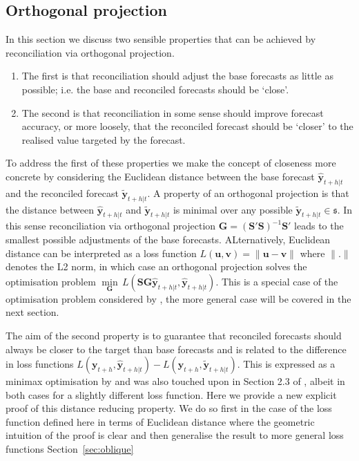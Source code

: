 \documentclass[12pt]{article}
\theoremstyle{definition}
\begin{document}
\subsection{Orthogonal projection}\label{sec:orthogonal}

In this section we discuss two sensible properties that can be achieved by reconciliation via orthogonal projection.
\begin{enumerate}
\item The first is that reconciliation should adjust the base forecasts as little as possible; i.e. the base and reconciled forecasts should be `close'.
\item The second is that reconciliation in some sense should improve forecast accuracy, or more loosely, that the reconciled forecast should be `closer' to the realised value targeted by the forecast.
\end{enumerate}

To address the first of these properties we make the concept of closeness more concrete by considering the Euclidean distance between the base forecast $\hat{\bm{y}}_{t+h|t}$ and the reconciled forecast $\tilde{\bm{y}}_{t+h|t}$. A property of an orthogonal projection is that the distance between $\hat{\bm{y}}_{t+h|t}$ and $\tilde{\bm{y}}_{t+h|t}$ is minimal over any possible $\tilde{\bm{y}}_{t+h|t}\in\mathfrak{s}$. In this sense reconciliation via orthogonal projection {\color{blue} $\bm{G}=(\bm{S}'\bm{S})^{-1}\bm{S}'$} leads to the smallest possible adjustments of the base forecasts.  {\color{blue} ALternatively, Euclidean distance can be interpreted as a loss function $L(\bm{u},\bm{v})=\|\bm{u}-\bm{v}\|$ where $\|.\|$ denotes the L2 norm, in which case an orthogonal projection solves the optimisation problem $\underset{\bm{G}}{\min}\,L(\bm{S}\bm{G}\hat{\bm{y}}_{t+h|t},\hat{\bm{y}}_{t+h|t})$. This is a special case of the optimisation problem considered by \cite{NysEtAl2019}, the more general case will be covered in the next section.}

The {\color{blue} aim of the second property is to guarantee that} reconciled forecasts should always be closer to the target than base forecasts {\color{blue} and is related to the difference in loss functions $L({\bm{y}}_{t+h},\hat{\bm{y}}_{t+h|t})-L({\bm{y}}_{t+h},\tilde{\bm{y}}_{t+h|t})$.  This is expressed as a minimax optimisation by \cite{VanErven2015a} and was also} touched upon in Section 2.3 of \citet{WicEtAl2019}{\color{blue}, albeit in both cases for a slightly different loss function}. Here we provide a new explicit proof of {\color{blue} this distance reducing property}. We do so first in the case {\color{blue} of the loss function defined here in terms of Euclidean distance} where the geometric intuition of the proof is clear and then generalise the result to {\color{blue} more general loss functions} Section~\ref{sec:oblique}
\end{document}
